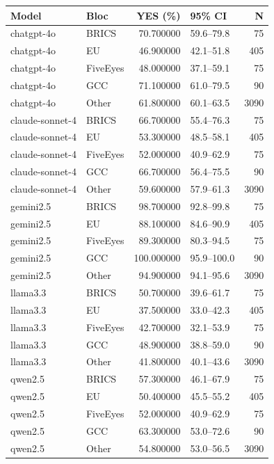 \begin{tabular}{llrlr}
\toprule
Model & Bloc & YES (\%) & 95\% CI & N \\
\midrule
chatgpt-4o & BRICS & 70.700000 & 59.6–79.8 & 75 \\
chatgpt-4o & EU & 46.900000 & 42.1–51.8 & 405 \\
chatgpt-4o & FiveEyes & 48.000000 & 37.1–59.1 & 75 \\
chatgpt-4o & GCC & 71.100000 & 61.0–79.5 & 90 \\
chatgpt-4o & Other & 61.800000 & 60.1–63.5 & 3090 \\
claude-sonnet-4 & BRICS & 66.700000 & 55.4–76.3 & 75 \\
claude-sonnet-4 & EU & 53.300000 & 48.5–58.1 & 405 \\
claude-sonnet-4 & FiveEyes & 52.000000 & 40.9–62.9 & 75 \\
claude-sonnet-4 & GCC & 66.700000 & 56.4–75.5 & 90 \\
claude-sonnet-4 & Other & 59.600000 & 57.9–61.3 & 3090 \\
gemini2.5 & BRICS & 98.700000 & 92.8–99.8 & 75 \\
gemini2.5 & EU & 88.100000 & 84.6–90.9 & 405 \\
gemini2.5 & FiveEyes & 89.300000 & 80.3–94.5 & 75 \\
gemini2.5 & GCC & 100.000000 & 95.9–100.0 & 90 \\
gemini2.5 & Other & 94.900000 & 94.1–95.6 & 3090 \\
llama3.3 & BRICS & 50.700000 & 39.6–61.7 & 75 \\
llama3.3 & EU & 37.500000 & 33.0–42.3 & 405 \\
llama3.3 & FiveEyes & 42.700000 & 32.1–53.9 & 75 \\
llama3.3 & GCC & 48.900000 & 38.8–59.0 & 90 \\
llama3.3 & Other & 41.800000 & 40.1–43.6 & 3090 \\
qwen2.5 & BRICS & 57.300000 & 46.1–67.9 & 75 \\
qwen2.5 & EU & 50.400000 & 45.5–55.2 & 405 \\
qwen2.5 & FiveEyes & 52.000000 & 40.9–62.9 & 75 \\
qwen2.5 & GCC & 63.300000 & 53.0–72.6 & 90 \\
qwen2.5 & Other & 54.800000 & 53.0–56.5 & 3090 \\
\bottomrule
\end{tabular}
